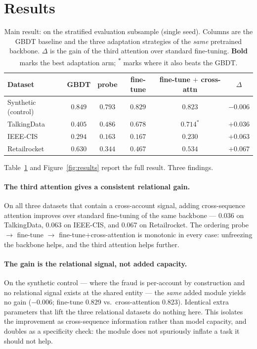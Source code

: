 \section{Results}
\label{sec:results}

\begin{table}[t]
\centering
\caption{Main result: \prauc{} on the stratified evaluation subsample (single seed). Columns are the
GBDT baseline and the three adaptation strategies of the \emph{same} pretrained backbone. $\Delta$ is
the gain of the third attention over standard fine-tuning. \textbf{Bold} marks the best adaptation
arm; \textsuperscript{$\ast$} marks where it also beats the GBDT.}
\label{tab:main}
\small
\begin{tabular}{lcccc c}
\toprule
Dataset & GBDT & probe & fine-tune & \makecell{fine-tune\\$+$ cross-attn} & $\Delta$ \\
\midrule
Synthetic (control) & $0.849$ & $0.793$ & $\mathbf{0.829}$ & $0.823$ & $-0.006$ \\
TalkingData         & $0.405$ & $0.486$ & $0.678$ & $\mathbf{0.714}^{\ast}$ & $+0.036$ \\
IEEE-CIS            & $0.294$ & $0.163$ & $0.167$ & $\mathbf{0.230}$ & $+0.063$ \\
Retailrocket        & $0.630$ & $0.344$ & $0.467$ & $\mathbf{0.534}$ & $+0.067$ \\
\bottomrule
\end{tabular}
\end{table}



Table~\ref{tab:main} and Figure~\ref{fig:results} report the full result. Three findings.

\paragraph{The third attention gives a consistent relational gain.} On all three datasets that
contain a cross-account signal, adding cross-sequence attention improves \prauc{} over standard
fine-tuning of the same backbone --- \num{+0.036} on TalkingData, \num{+0.063} on IEEE-CIS, and
\num{+0.067} on Retailrocket. The ordering probe $\to$ fine-tune $\to$ fine-tune$+$cross-attention is
monotonic in every case: unfreezing the backbone helps, and the third attention helps further.

\paragraph{The gain is the relational signal, not added capacity.} On the synthetic control --- where
the fraud is per-account by construction and no relational signal exists at the shared entity --- the
\emph{same} added module yields no gain (\num{-0.006}; fine-tune \num{0.829} vs.\ cross-attention
\num{0.823}). Identical extra parameters that lift the three relational datasets do nothing here.
This isolates the improvement as cross-sequence information rather than model capacity, and doubles
as a specificity check: the module does not spuriously inflate a task it should not help.


